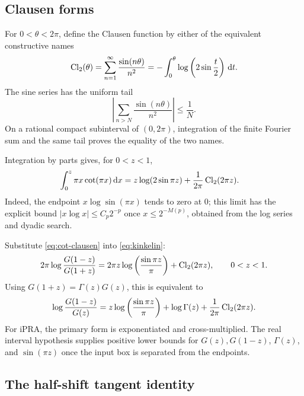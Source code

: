 \subsection{Clausen forms}

For \(0<\theta<2\pi\), define the Clausen function by either of the equivalent
constructive names
\begin{equation}\label{eq:clausen}
 \operatorname{Cl}_2(\theta)=\sum_{n=1}^{\infty}\frac{\sin(n\theta)}{n^2}
 =-\int_0^\theta\log\left(2\sin\frac t2\right)\,\mathrm d t.
\end{equation}
The sine series has the uniform tail
\[
 \left|\sum_{n>N}\frac{\sin(n\theta)}{n^2}\right|\le\frac1N.
\]
On a rational compact subinterval of \((0,2\pi)\), integration of the finite
Fourier sum and the same tail proves the equality of the two names.

Integration by parts gives, for \(0<z<1\),
\begin{align}
 \int_0^z\pi x\cot(\pi x)\,\mathrm d x
 &=z\log(2\sin\pi z)
   +\frac{1}{2\pi}\operatorname{Cl}_2(2\pi z).
 \label{eq:cot-clausen}
\end{align}
Indeed, the endpoint \(x\log\sin(\pi x)\) tends to zero at \(0\); this limit has
the explicit bound
\(|x\log x|\le C_p2^{-p}\) once \(x\le2^{-M(p)}\), obtained from the log
series and dyadic search.

Substitute \cref{eq:cot-clausen} into \cref{eq:kinkelin}:
\begin{equation}\label{eq:clausen-reflection}
 2\pi\log\frac{G(1-z)}{G(1+z)}
 =2\pi z\log\left(\frac{\sin\pi z}{\pi}\right)
  +\operatorname{Cl}_2(2\pi z),
 \qquad 0<z<1.
\end{equation}
Using \(G(1+z)=\Gamma(z)G(z)\), this is equivalent to
\begin{equation}\label{eq:clausen-reflection2}
 \log\frac{G(1-z)}{G(z)}
 =z\log\left(\frac{\sin\pi z}{\pi}\right)
  +\log\Gamma(z)+\frac{1}{2\pi}\operatorname{Cl}_2(2\pi z).
\end{equation}
For iPRA, the primary form is exponentiated and cross-multiplied.  The real
interval hypothesis supplies positive lower bounds for \(G(z),G(1-z)\),
\(\Gamma(z)\), and \(\sin(\pi z)\) once the input box is separated from the
endpoints.

\subsection{The half-shift tangent identity}


